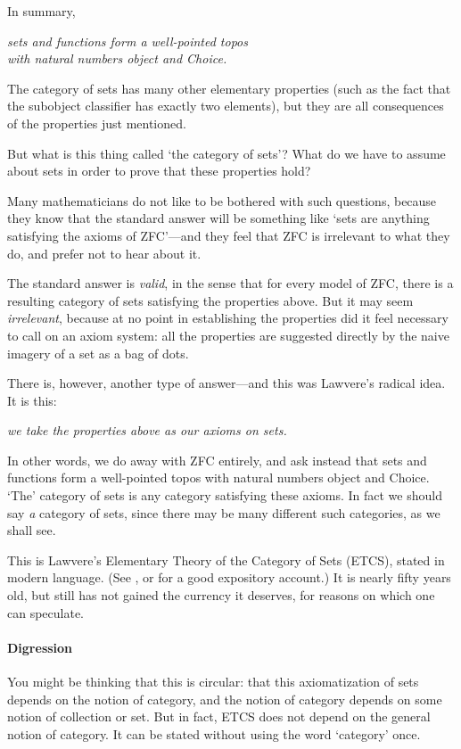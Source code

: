 \documentclass[12pt]{article}
\newcommand{\slogan}[1]{\begin{center}\it #1\end{center}}
\begin{document}
In summary,
% 
\slogan{sets and functions form a well-pointed topos\\
with natural numbers object and Choice.}
% 
The category of sets has many other elementary properties (such as the fact
that the subobject classifier has exactly two elements), but they are all
consequences of the properties just mentioned.

But what is this thing called `the category of sets'?  What do we have to
assume about sets in order to prove that these properties hold?  

Many mathematicians do not like to be bothered with such questions, because
they know that the standard answer will be something like `sets are anything
satisfying the axioms of ZFC'---and they feel that ZFC is irrelevant to what
they do, and prefer not to hear about it.

The standard answer is \emph{valid}, in the sense that for every model of
ZFC, there is a resulting category of sets satisfying the properties
above.  But it may seem \emph{irrelevant}, because at no point in establishing
the properties did it feel necessary to call on an axiom system: all the
properties are suggested directly by the naive imagery of a set as a bag of
dots.  

There is, however, another type of answer---and this was Lawvere's radical
idea.  It is this: 
% 
\slogan{we take the properties above as our axioms on sets.}
% 
In other words, we do away with ZFC entirely, and ask instead that sets and
functions form a well-pointed topos with natural numbers object and Choice.
`The' category of sets is any category satisfying these axioms.  In fact we
should say \emph{a} category of sets, since there may be many different such
categories, as we shall see.

This is Lawvere's Elementary Theory of the Category of Sets (ETCS), stated in
modern language.  (See \citet{LawETCS}, or \citet{LaRo} for a good expository
account.)  It is nearly fifty years old, but still has not gained the currency
it deserves, for reasons on which one can speculate.

\paragraph*{Digression} You might be thinking that this is circular: that this
axiomatization of sets 
depends on the notion of category, and the notion of category depends on some
notion of collection or set.  But in fact, ETCS does not depend on the general
notion of category.  It can be stated without using the word `category' once.
\end{document}
